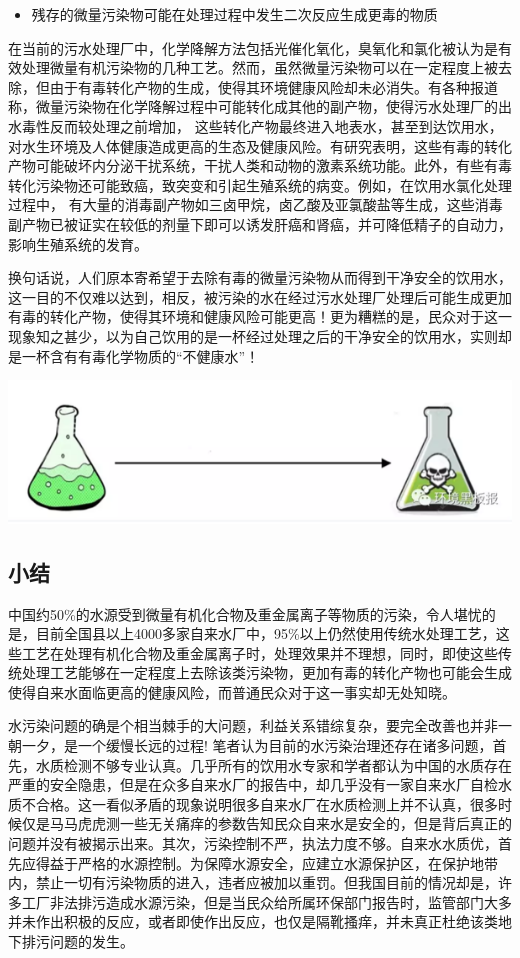 \documentclass[]{book}
\providecommand{\tightlist}{%
  \setlength{\itemsep}{0pt}\setlength{\parskip}{0pt}}
\begin{document}
\begin{itemize}
\tightlist
\item
  残存的微量污染物可能在处理过程中发生二次反应生成更毒的物质
\end{itemize}

在当前的污水处理厂中，化学降解方法包括光催化氧化，臭氧化和氯化被认为是有效处理微量有机污染物的几种工艺。然而，虽然微量污染物可以在一定程度上被去除，但由于有毒转化产物的生成，使得其环境健康风险却未必消失。有各种报道称，微量污染物在化学降解过程中可能转化成其他的副产物，使得污水处理厂的出水毒性反而较处理之前增加，
这些转化产物最终进入地表水，甚至到达饮用水，对水生环境及人体健康造成更高的生态及健康风险。有研究表明，这些有毒的转化产物可能破坏内分泌干扰系统，干扰人类和动物的激素系统功能。此外，有些有毒转化污染物还可能致癌，致突变和引起生殖系统的病变。例如，在饮用水氯化处理过程中，
有大量的消毒副产物如三卤甲烷，卤乙酸及亚氯酸盐等生成，这些消毒副产物已被证实在较低的剂量下即可以诱发肝癌和肾癌，并可降低精子的自动力，影响生殖系统的发育。

换句话说，人们原本寄希望于去除有毒的微量污染物从而得到干净安全的饮用水，这一目的不仅难以达到，相反，被污染的水在经过污水处理厂处理后可能生成更加有毒的转化产物，使得其环境和健康风险可能更高！更为糟糕的是，民众对于这一现象知之甚少，以为自己饮用的是一杯经过处理之后的干净安全的饮用水，实则却是一杯含有有毒化学物质的``不健康水''！

\includegraphics[width=8.33in]{images/dushui4}

\subsection{小结}\label{-1}

中国约50\%的水源受到微量有机化合物及重金属离子等物质的污染，令人堪忧的是，目前全国县以上4000多家自来水厂中，95\%以上仍然使用传统水处理工艺，这些工艺在处理有机化合物及重金属离子时，处理效果并不理想，同时，即使这些传统处理工艺能够在一定程度上去除该类污染物，更加有毒的转化产物也可能会生成使得自来水面临更高的健康风险，而普通民众对于这一事实却无处知晓。

水污染问题的确是个相当棘手的大问题，利益关系错综复杂，要完全改善也并非一朝一夕，是一个缓慢长远的过程!
笔者认为目前的水污染治理还存在诸多问题，首先，水质检测不够专业认真。几乎所有的饮用水专家和学者都认为中国的水质存在严重的安全隐患，但是在众多自来水厂的报告中，却几乎没有一家自来水厂自检水质不合格。这一看似矛盾的现象说明很多自来水厂在水质检测上并不认真，很多时候仅是马马虎虎测一些无关痛痒的参数告知民众自来水是安全的，但是背后真正的问题并没有被揭示出来。其次，污染控制不严，执法力度不够。自来水水质优，首先应得益于严格的水源控制。为保障水源安全，应建立水源保护区，在保护地带内，禁止一切有污染物质的进入，违者应被加以重罚。但我国目前的情况却是，许多工厂非法排污造成水源污染，但是当民众给所属环保部门报告时，监管部门大多并未作出积极的反应，或者即使作出反应，也仅是隔靴搔痒，并未真正杜绝该类地下排污问题的发生。
\end{document}
